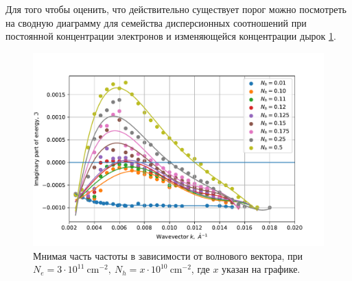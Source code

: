 \documentclass[../main.tex]{subfiles}
\begin{document}
    Для того чтобы оценить, что действительно существует порог можно посмотреть на сводную диаграмму для семейства дисперсионных соотношений
    при постоянной концентрации электронов и изменяющейся концентрации дырок \ref{plasmon:6nm3neXnpim}.

    \begin{figure}[h]
        \begin{minipage}[h]{1\textwidth}
            \includegraphics[width=1\textwidth]{./images/plazmon6nm3neXnpim.pdf}
            \caption{Мнимая часть частоты в зависимости от волнового вектора, при $N_e = 3 \cdot 10^{11}~\text{cm}^{-2},~N_h = x \cdot 10^{10}~\text{cm}^{-2}$,
            где $x$ указан на графике.\label{plasmon:6nm3neXnpim}}
        \end{minipage}
    \end{figure}
    
\end{document}
